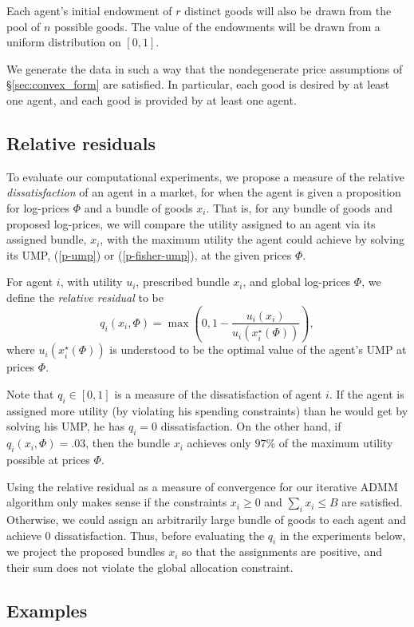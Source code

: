 \documentclass[12pt]{article}
\begin{document}
Each agent's initial endowment of $r$ distinct goods will also be drawn
from the pool of $n$ possible goods. The value of the endowments
will be drawn from a uniform distribution on $[0,1]$.

We generate the data in such a way that the nondegenerate price assumptions
of \S\ref{sec:convex_form} are satisfied. In particular,
each good is desired by at least one agent, and each good is provided by
at least one agent.

\subsection{Relative residuals}

To evaluate our computational experiments, we propose a measure of the relative
\emph{dissatisfaction} of an agent in a market, for when the agent is given a
proposition for log-prices $\Phi$ and a bundle of goods $x_i$. That is, for any
bundle of goods and proposed log-prices, we will compare the utility assigned
to an agent via its assigned bundle, $x_i$, with the maximum utility the agent
could achieve by solving its UMP, (\ref{p-ump}) or (\ref{p-fisher-ump}), at the
given prices $\Phi$.

For agent $i$, with utility $u_i$, prescribed bundle $x_i$, and global log-prices $\Phi$,
we define the \emph{relative residual} to be
\[
q_i(x_i, \Phi)= \max\left(0,1-\frac{u_i(x_i)}{u_i(x_i^\star(\Phi))}\right),
\]
where $u_i(x_i^\star(\Phi))$ is understood to be the optimal value
of the agent's UMP at prices $\Phi$.

Note that $q_i \in [0,1]$ is a measure of the dissatisfaction of agent $i$. If
the agent is assigned more utility (by violating his spending constraints) than
he would get by solving his UMP, he has $q_i = 0$ dissatisfaction. On the other
hand, if $q_i(x_i, \Phi) = .03$, then the bundle $x_i$ achieves
only $97\%$ of the maximum utility possible at prices $\Phi$.

Using the relative residual as a measure of convergence for our iterative ADMM
algorithm only makes sense if the constraints $x_i \geq 0$ and $\sum_i x_i \leq
B$ are satisfied. Otherwise, we could assign an arbitrarily large bundle of
goods  to each agent and achieve $0$ dissatisfaction. Thus, before evaluating
the $q_i$ in the experiments below, we project the proposed bundles $x_i$ so
that the assignments are positive, and their sum does not violate the global
allocation constraint.

\subsection{Examples}
\end{document}
